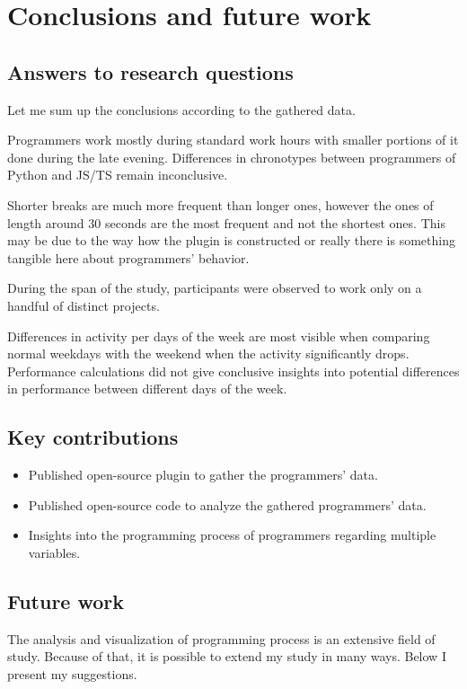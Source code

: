 \chapter{Conclusions and future work}

\section{Answers to research questions}
Let me sum up the conclusions according to the gathered data.

Programmers work mostly during standard work hours with smaller portions of it done during the late evening. Differences in chronotypes between programmers of Python and JS/TS remain inconclusive.

Shorter breaks are much more frequent than longer ones, however the ones of length around 30 seconds are the most frequent and not the shortest ones. This may be due to the way how the plugin is constructed or really there is something tangible here about programmers' behavior.

During the span of the study, participants were observed to work only on a handful of distinct projects.

Differences in activity per days of the week are most visible when comparing normal weekdays with the weekend when the activity significantly drops. Performance calculations did not give conclusive insights into potential differences in performance between different days of the week.

\section{Key contributions}

\begin{itemize}
    \item Published open-source plugin to gather the programmers' data.
    \item Published open-source code to analyze the gathered programmers' data.
    \item Insights into the programming process of programmers regarding multiple variables.
\end{itemize}

\section{Future work}

The analysis and visualization of programming process is an extensive field of study. Because of that, it is possible to extend my study in many ways. Below I present my suggestions.

